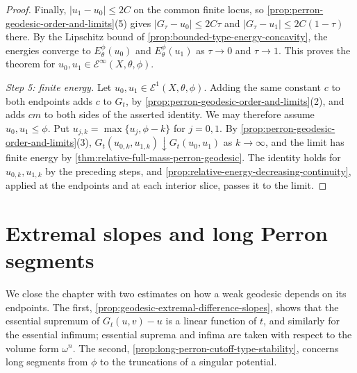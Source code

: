 \begin{proof}
Finally, $|u_1-u_0|\leq2C$ on the common finite locus, so \cref{prop:perron-geodesic-order-and-limits}(5) gives $|G_\tau-u_0|\leq2C\tau$ and $|G_\tau-u_1|\leq2C(1-\tau)$ there. By the Lipschitz bound of \cref{prop:bounded-type-energy-concavity}, the energies converge to $E_\theta^\phi(u_0)$ and $E_\theta^\phi(u_1)$ as $\tau\to0$ and $\tau\to1$. This proves the theorem for $u_0,u_1\in\mathcal E^\infty(X,\theta,\phi)$.

\emph{Step 5: finite energy.} Let $u_0,u_1\in\mathcal E^1(X,\theta,\phi)$. Adding the same constant $c$ to both endpoints adds $c$ to $G_t$, by \cref{prop:perron-geodesic-order-and-limits}(2), and adds $cm$ to both sides of the asserted identity. We may therefore assume $u_0,u_1\leq\phi$. Put $u_{j,k}=\max\{u_j,\phi-k\}$ for $j=0,1$. By \cref{prop:perron-geodesic-order-and-limits}(3), $G_t(u_{0,k},u_{1,k})\downarrow G_t(u_0,u_1)$ as $k\to\infty$, and the limit has finite energy by \cref{thm:relative-full-mass-perron-geodesic}. The identity holds for $u_{0,k},u_{1,k}$ by the preceding steps, and \cref{prop:relative-energy-decreasing-continuity}, applied at the endpoints and at each interior slice, passes it to the limit.
\end{proof}

\section{Extremal slopes and long Perron segments}
\label{sec:perron-extremal-slopes-and-cutoffs}
We close the chapter with two estimates on how a weak geodesic depends on its endpoints. The first, \cref{prop:geodesic-extremal-difference-slopes}, shows that the essential supremum of $G_t(u,v)-u$ is a linear function of $t$, and similarly for the essential infimum; essential suprema and infima are taken with respect to the volume form $\omega^n$. The second, \cref{prop:long-perron-cutoff-type-stability}, concerns long segments from $\phi$ to the truncations of a singular potential.

